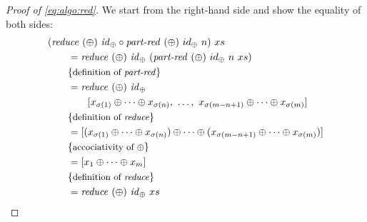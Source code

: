 \begin{proof}[Proof of \autoref{eq:algo:red}]
  We start from the right-hand side and show the equality of both sides:
  \begin{align*}
    &(\reduce\ (\oplus)\ \id_\oplus \circ \partRed\ (\oplus)\ id_\oplus\ n)\ xs\\
    &\qquad = \reduce\ (\oplus)\ \id_\oplus\ (\partRed\ (\oplus)\ id_\oplus\ n\ xs)\\
    &\qquad \comment{definition of \partRed}\\
    &\qquad = \reduce\ (\oplus)\ \id_\oplus\\
    &\qquad\qquad [x_{\sigma(1)} \oplus \dots \oplus x_{\sigma(n)},\ \dots ,\ x_{\sigma(m-n+1)} \oplus \dots \oplus x_{\sigma(m)}]\\
    &\qquad \comment{definition of \reduce}\\
    &\qquad = [(x_{\sigma(1)} \oplus \dots \oplus x_{\sigma(n)}) \oplus \dots \oplus (x_{\sigma(m-n+1)} \oplus \dots \oplus x_{\sigma(m)})]\\
    &\qquad \comment{accociativity of $\oplus$}\\
    &\qquad = [x_1 \oplus \dots \oplus x_m]\\
    &\qquad \comment{definition of \reduce}\\
    &\qquad = \reduce\ (\oplus)\ \id_\oplus\ xs
  \end{align*}
\end{proof}

